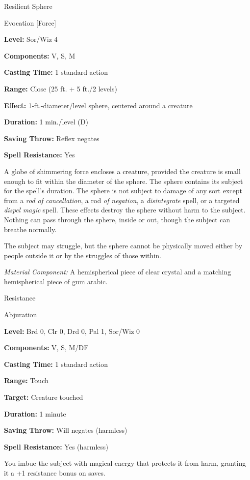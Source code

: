 \documentclass{article}
\begin{document}
\vspace{12pt}
Resilient Sphere

Evocation [Force]

\textbf{Level:} Sor/Wiz 4

\textbf{Components:} V, S, M

\textbf{Casting Time:} 1 standard action

\textbf{Range:} Close (25 ft. + 5 ft./2 levels)

\textbf{Effect:} 1-ft.-diameter/level sphere, centered around a creature

\textbf{Duration:} 1 min./level (D)

\textbf{Saving Throw:} Reflex negates

\textbf{Spell Resistance:} Yes

A globe of shimmering force encloses a creature, provided the creature is small 
enough to fit within the diameter of the sphere. The sphere contains its subject 
for the spell's duration. The sphere is not subject to damage of any sort except 
from a \textit{rod of cancellation}, a rod \textit{of negation}, a \textit{disintegrate 
}spell, or a targeted \textit{dispel magic }spell. These effects destroy the sphere 
without harm to the subject. Nothing can pass through the sphere, inside or out, 
though the subject can breathe normally.

The subject may struggle, but the sphere cannot be physically moved either by people 
outside it or by the struggles of those within.

\textit{Material Component: }A hemispherical piece of clear crystal and a matching 
hemispherical piece of gum arabic.

\vspace{12pt}
Resistance

Abjuration

\textbf{Level:} Brd 0, Clr 0, Drd 0, Pal 1, Sor/Wiz 0

\textbf{Components:} V, S, M/DF

\textbf{Casting Time:} 1 standard action

\textbf{Range:} Touch

\textbf{Target:} Creature touched

\textbf{Duration:} 1 minute

\textbf{Saving Throw: }Will negates (harmless)

\textbf{Spell Resistance:} Yes (harmless)

You imbue the subject with magical energy that protects it from harm, granting 
it a +1 resistance bonus on saves.
\end{document}
